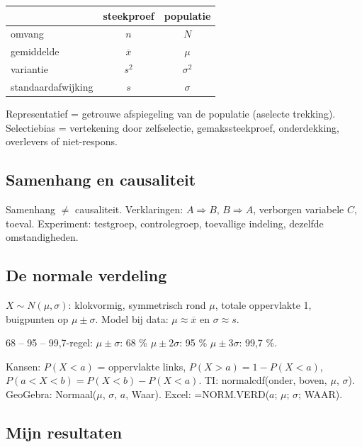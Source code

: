 \begin{tabular}{lcc}
\hline
 & steekproef & populatie \\
\hline
omvang & $n$ & $N$ \\
gemiddelde & $\overline{x}$ & $\mu$ \\
variantie & $s^2$ & $\sigma^2$ \\
standaardafwijking & $s$ & $\sigma$ \\
\hline
\end{tabular}

Representatief = getrouwe afspiegeling van de populatie (aselecte trekking). Selectiebias = vertekening door zelfselectie, gemakssteekproef, onderdekking, overlevers of niet-respons.

\subsection*{Samenhang en causaliteit}

Samenhang $\neq$ causaliteit. Verklaringen: $A\Rightarrow B$, $B\Rightarrow A$, verborgen variabele $C$, toeval. Experiment: testgroep, controlegroep, toevallige indeling, dezelfde omstandigheden.

\subsection*{De normale verdeling}

\begin{theorie}
$X\sim N(\mu,\sigma)$: klokvormig, symmetrisch rond $\mu$, totale oppervlakte 1, buigpunten op $\mu\pm\sigma$. Model bij data: $\mu\approx\overline{x}$ en $\sigma\approx s$.

68 – 95 – 99,7-regel: $\mu\pm\sigma$: 68 \% \quad $\mu\pm 2\sigma$: 95 \% \quad $\mu\pm 3\sigma$: 99,7 \%.

Kansen: $P(X<a)$ = oppervlakte links, $P(X>a)=1-P(X<a)$, $P(a<X<b)=P(X<b)-P(X<a)$. TI: normalcdf(onder, boven, $\mu$, $\sigma$). GeoGebra: Normaal($\mu$, $\sigma$, $a$, Waar). Excel: =NORM.VERD($a$; $\mu$; $\sigma$; WAAR).
\end{theorie}

\subsection*{Mijn resultaten}

